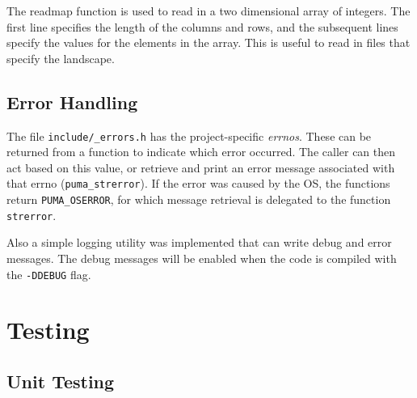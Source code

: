 \documentclass[12pt,a4paper]{article}
\begin{document}
The readmap function is used to read in a two dimensional array of integers. The first line specifies the length of the columns and rows, and the subsequent lines specify the values for the elements in the array. This is useful to read in files that specify the landscape.

\subsection{Error Handling}

The file \texttt{include/\_errors.h} has the project-specific \emph{errnos}. These can be returned from a function to indicate which error occurred. The caller can then act based on this value, or retrieve and print an error message associated with that errno (\texttt{puma\_strerror}). If the error was caused by the OS, the functions return \texttt{PUMA\_OSERROR}, for which message retrieval is delegated to the function \texttt{strerror}.

Also a simple logging utility was implemented that can write debug and error messages. The debug messages will be enabled when the code is compiled with the \texttt{-DDEBUG} flag.






\section{Testing}

\subsection{Unit Testing}
\end{document}
